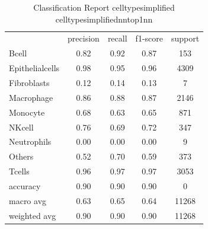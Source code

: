 \begin{table}[htbp]
\centering
\caption{Classification Report celltypesimplified celltypesimplifiednntop1nn}
\label{tab:classificationreport.celltypesimplified.celltypesimplifiednntop1nn}
\begin{tabular}{lcccc}
 & precision & recall & f1-score & support \\
Bcell & 0.82 & 0.92 & 0.87 & 153 \\
Epithelialcells & 0.98 & 0.95 & 0.96 & 4309 \\
Fibroblasts & 0.12 & 0.14 & 0.13 & 7 \\
Macrophage & 0.86 & 0.88 & 0.87 & 2146 \\
Monocyte & 0.68 & 0.63 & 0.65 & 871 \\
NKcell & 0.76 & 0.69 & 0.72 & 347 \\
Neutrophils & 0.00 & 0.00 & 0.00 & 9 \\
Others & 0.52 & 0.70 & 0.59 & 373 \\
Tcells & 0.96 & 0.97 & 0.97 & 3053 \\
accuracy & 0.90 & 0.90 & 0.90 & 0 \\
macro avg & 0.63 & 0.65 & 0.64 & 11268 \\
weighted avg & 0.90 & 0.90 & 0.90 & 11268 \\
\end{tabular}
\end{table}
